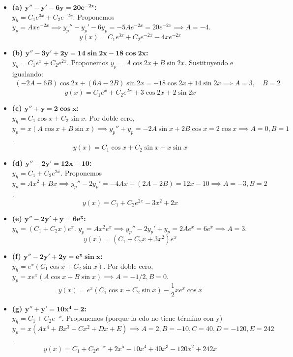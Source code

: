 \documentclass[11pt, a4paper]{article}
\begin{document}
\begin{itemize}
\item \textbf{(a) $\bm{y''-y'-6y=20e^{-2x}}$:} \\
$y_h = C_1 e^{3x} + C_2 e^{-2x}$. Proponemos $y_p = A x e^{-2x} \implies y_p'' - y_p' - 6y_p = -5A e^{-2x} = 20e^{-2x} \implies A = -4$.
\[
\boxed{y(x) = C_1 e^{3x} + C_2 e^{-2x} - 4x e^{-2x}}
\]

\item \textbf{(b) $\bm{y''-3y'+2y=14\sin 2x - 18\cos 2x}$:} \\
$y_h = C_1 e^x + C_2 e^{2x}$. Proponemos $y_p = A\cos 2x + B\sin 2x$. Sustituyendo e igualando:
\begin{align*}
(-2A - 6B)\cos 2x + (6A - 2B)\sin 2x = -18\cos 2x + 14\sin 2x \implies A = 3, \quad B = 2
\end{align*}
\[
\boxed{y(x) = C_1 e^x + C_2 e^{2x} + 3\cos 2x + 2\sin 2x}
\]

\item \textbf{(c) $\bm{y''+y=2\cos x}$:} \\
$y_h = C_1 \cos x + C_2 \sin x$. Por doble cero, $y_p = x(A\cos x + B\sin x) \implies y_p'' + y_p = -2A\sin x + 2B\cos x = 2\cos x \implies A = 0, B = 1$.
\[
\boxed{y(x) = C_1 \cos x + C_2 \sin x + x \sin x}
\]

\item \textbf{(d) $\bm{y''-2y'=12x-10}$:} \\
$y_h = C_1 + C_2 e^{2x}$. Proponemos $y_p = Ax^2 + Bx \implies y_p'' - 2y_p' = -4Ax + (2A - 2B) = 12x - 10 \implies A = -3, B = 2$.
\[
\boxed{y(x) = C_1 + C_2 e^{2x} - 3x^2 + 2x}
\]

\item \textbf{(e) $\bm{y''-2y'+y=6e^x}$:} \\
$y_h = (C_1 + C_2 x)e^x$. $y_p = A x^2 e^x \implies y_p'' - 2y_p' + y_p = 2A e^x = 6e^x \implies A = 3$.
\[
\boxed{y(x) = (C_1 + C_2 x + 3x^2)e^x}
\]

\item \textbf{(f) $\bm{y''-2y'+2y=e^x \sin x}$:} \\
$y_h = e^x(C_1 \cos x + C_2 \sin x)$. Por doble cero, $y_p = x e^x (A\cos x + B\sin x) \implies A = -1/2, B = 0$.
\[
\boxed{y(x) = e^x(C_1 \cos x + C_2 \sin x) - \frac{1}{2}x e^x \cos x}
\]

\item \textbf{(g) $\bm{y''+y'=10x^4+2}$:} \\
$y_h = C_1 + C_2 e^{-x}$. Proponemos (porque la edo no tiene término con y) $y_p = x(Ax^4 + Bx^3 + Cx^2 + Dx + E)   \implies A=2, B=-10, C=40, D=-120, E=242$.
\[
\boxed{y(x) = C_1 + C_2 e^{-x} + 2x^5 - 10x^4 + 40x^3 - 120x^2 + 242x}
\]


\end{itemize}
\end{document}
